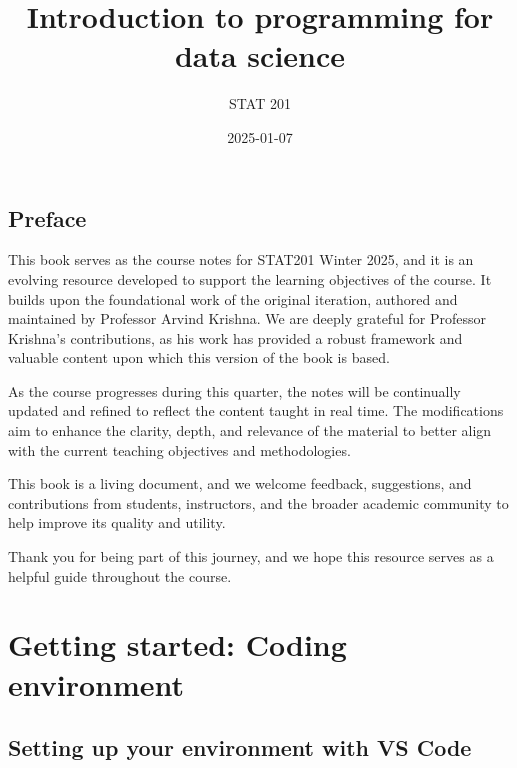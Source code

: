 \documentclass[
  letterpaper,
  DIV=11,
  numbers=noendperiod]{scrreprt}
\title{Introduction to programming for data science}
\subtitle{STAT 201}
\author{}
\date{2025-01-07}
\renewcommand*\contentsname{Table of contents}
\newcommand\contentsname{Table of contents}
\begin{document}
\maketitle
\ifdefined\Shaded\renewenvironment{Shaded}{\begin{tcolorbox}[sharp corners, frame hidden, interior hidden, enhanced, boxrule=0pt, borderline west={3pt}{0pt}{shadecolor}, breakable]}{\end{tcolorbox}}\fi

\renewcommand*\contentsname{Table of contents}
{
\hypersetup{linkcolor=}
\setcounter{tocdepth}{2}
\tableofcontents
}

\hypertarget{preface}{%
\chapter*{Preface}\label{preface}}


This book serves as the course notes for STAT201 Winter 2025, and it is
an evolving resource developed to support the learning objectives of the
course. It builds upon the foundational work of the original iteration,
authored and maintained by Professor Arvind Krishna. We are deeply
grateful for Professor Krishna's contributions, as his work has provided
a robust framework and valuable content upon which this version of the
book is based.

As the course progresses during this quarter, the notes will be
continually updated and refined to reflect the content taught in real
time. The modifications aim to enhance the clarity, depth, and relevance
of the material to better align with the current teaching objectives and
methodologies.

This book is a living document, and we welcome feedback, suggestions,
and contributions from students, instructors, and the broader academic
community to help improve its quality and utility.

Thank you for being part of this journey, and we hope this resource
serves as a helpful guide throughout the course.

\part{Getting started: Coding environment}

\hypertarget{setting-up-your-environment-with-vs-code}{%
\chapter{Setting up your environment with VS
Code}\label{setting-up-your-environment-with-vs-code}}
\end{document}
